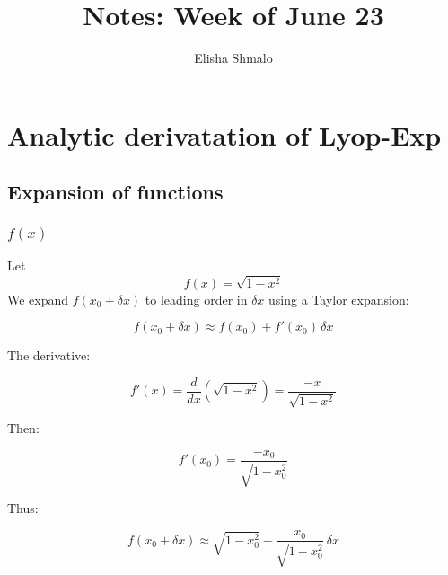\documentclass{article}
\author{Elisha Shmalo}
\title{Notes: Week of June 23}
\begin{document}
\maketitle

\section{Analytic derivatation of Lyop-Exp}

\subsection{Expansion of functions}
\subsubsection{$f(x)$}
Let 
\[
f(x) = \sqrt{1 - x^2}
\]
We expand \( f(x_0 + \delta x) \) to leading order in \( \delta x \) using a Taylor expansion:

\[
f(x_0 + \delta x) \approx f(x_0) + f'(x_0) \, \delta x
\]

The derivative:

\[
f'(x) = \frac{d}{dx} \left( \sqrt{1 - x^2} \right) = \frac{-x}{\sqrt{1 - x^2}}
\]

Then:

\[
f'(x_0) = \frac{-x_0}{\sqrt{1 - x_0^2}}
\]

Thus:

\[
f(x_0 + \delta x) \approx \sqrt{1 - x_0^2} - \frac{x_0}{\sqrt{1 - x_0^2}} \, \delta x
\]
\end{document}
